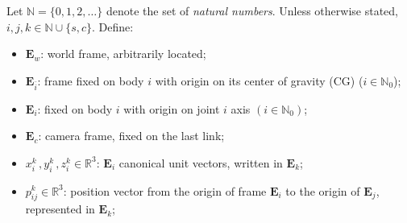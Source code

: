 Let $\mathbb{N} = \{0,1,2,\dots\}$ denote the set of \textit{natural numbers}.
Unless otherwise stated, $i, j, k \in \mathbb{N} \cup \{s,c\}$.
%
%
Define:
%
\begin{itemize}
\item $\mathbf{E}_{w}$: world frame, arbitrarily located;
\item $\mathbf{E}_{\bar{i}}$: frame fixed on body $i$ with origin on its center of gravity (CG) ($i \in \mathbb{N}_0$);
\item $\mathbf{E}_{i}$: fixed on body $i$ with origin on joint $i$ axis $(i \in \mathbb{N}_0)$;
\item $\mathbf{E}_{c}$: camera frame, fixed on the last link;
%
\item $x^k_i\,,y^k_i\,,z^k_i \in \mathbb{R}^{3}$: $\mathbf{E}_i$ canonical unit vectors, written in $\mathbf{E}_k$;
%
%
\item $p^{k}_{ij} \in \mathbb{R}^{3}$: position vector from the origin of frame $\mathbf{E}_i$ to the origin of $\mathbf{E}_{j}$, represented in $\mathbf{E}_k$;

\end{itemize}
